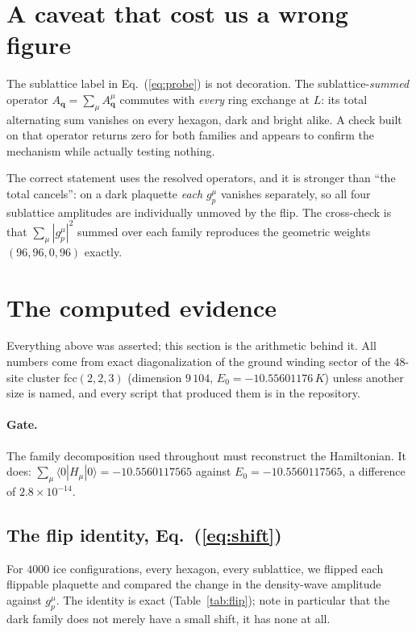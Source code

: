 \documentclass[11pt]{article}
\newcommand{\bq}{\bm q}
\begin{document}
\section{A caveat that cost us a wrong figure}
\label{sec:caveat}

The sublattice label in Eq.~(\ref{eq:probe}) is not decoration. The
sublattice-\emph{summed} operator $A_{\bq}=\sum_\mu A^\mu_{\bq}$
commutes with \emph{every} ring exchange at $L$: its total alternating
sum vanishes on every hexagon, dark and bright alike. A check built on
that operator returns zero for both families and appears to confirm the
mechanism while actually testing nothing.

The correct statement uses the resolved operators, and it is stronger
than ``the total cancels'': on a dark plaquette
\emph{each} $g^\mu_p$ vanishes separately, so all four sublattice
amplitudes are individually unmoved by the flip. The cross-check is
that $\sum_\mu|g^\mu_p|^2$ summed over each family reproduces the
geometric weights $(96,96,0,96)$ exactly.

\section{The computed evidence}
\label{sec:evidence}

Everything above was asserted; this section is the arithmetic behind it.
All numbers come from exact diagonalization of the ground winding sector
of the $48$-site cluster fcc$(2,2,3)$ (dimension $9\,104$,
$E_0=-10.55601176\,K$) unless another size is named, and every script
that produced them is in the repository.

\paragraph{Gate.} The family decomposition used throughout must
reconstruct the Hamiltonian. It does:
$\sum_\mu\langle0|H_\mu|0\rangle=-10.5560117565$ against
$E_0=-10.5560117565$, a difference of $2.8\times10^{-14}$.

\subsection{The flip identity, Eq.~(\ref{eq:shift})}

For $4000$ ice configurations, every hexagon, every sublattice, we
flipped each flippable plaquette and compared the change in the
density-wave amplitude against $g^\mu_p$. The identity is exact
(Table~\ref{tab:flip}); note in particular that the dark family does not
merely have a small shift, it has none at all.
\end{document}
